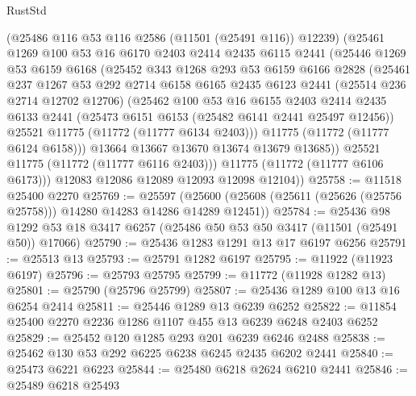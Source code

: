 \begin{lexlean}{RustStd}
\begin{coremodule}
          (@25486 @116 @53 @116 @2586 (@11501 (@25491 @116)) @12239)
          (@25461
            @1269
            @100
            @53
            @16
            @6170
            @2403
            @2414
            @2435
            @6115
            @2441
            (@25446
              @1269
              @53
              @6159
              @6168
              (@25452
                @343
                @1268
                @293
                @53
                @6159
                @6166
                @2828
                (@25461
                  @237
                  @1267
                  @53
                  @292
                  @2714
                  @6158
                  @6165
                  @2435
                  @6123
                  @2441
                  (@25514 @236 @2714 @12702 @12706)
                  (@25462
                    @100
                    @53
                    @16
                    @6155
                    @2403
                    @2414
                    @2435
                    @6133
                    @2441
                    (@25473 @6151 @6153 (@25482 @6141 @2441 @25497 @12456))
                    @25521
                    @11775
                    (@11772 (@11777 @6134 @2403)))
                  @11775
                  (@11772 (@11777 @6124 @6158)))
                @13664
                @13667
                @13670
                @13674
                @13679
                @13685))
            @25521
            @11775
            (@11772 (@11777 @6116 @2403)))
          @11775
          (@11772 (@11777 @6106 @6173)))
        @12083
        @12086
        @12089
        @12093
        @12098
        @12104))
@25758 := @11518 @25400 @2270
@25769 := @25597
    (@25600 (@25608 (@25611 (@25626 (@25756 @25758))) @14280 @14283 @14286 @14289 @12451))
@25784 := @25436
    @98
    @1292
    @53
    @18
    @3417
    @6257
    (@25486 @50 @53 @50 @3417 (@11501 (@25491 @50)) @17066)
@25790 := @25436 @1283 @1291 @13 @17 @6197 @6256
@25791 := @25513 @13
@25793 := @25791 @1282 @6197
@25795 := @11922 (@11923 @6197)
@25796 := @25793 @25795
@25799 := @11772 (@11928 @1282 @13)
@25801 := @25790 (@25796 @25799)
@25807 := @25436 @1289 @100 @13 @16 @6254 @2414
@25811 := @25446 @1289 @13 @6239 @6252
@25822 := @11854 @25400 @2270 @2236 @1286 @1107 @455 @13 @6239 @6248 @2403 @6252
@25829 := @25452 @120 @1285 @293 @201 @6239 @6246 @2488
@25838 := @25462 @130 @53 @292 @6225 @6238 @6245 @2435 @6202 @2441
@25840 := @25473 @6221 @6223
@25844 := @25480 @6218 @2624 @6210 @2441
@25846 := @25489 @6218 @25493

\end{coremodule}
\end{lexlean}
